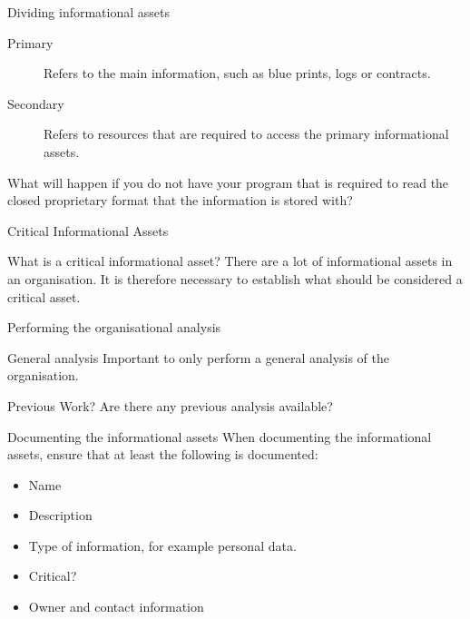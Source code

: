 \documentclass{beamer}
\begin{document}
\begin{frame}{Dividing informational assets}{\insertsubsubsectionhead}
  \begin{description}
    \item[Primary] Refers to the main information, such as blue prints, logs or
      contracts.
    \item[Secondary] Refers to resources that are required to access the primary
      informational assets.
  \end{description}
  What will happen if you do not have your program that is required to read the
  closed proprietary format that the information is stored with?
\end{frame}
\begin{frame}{Critical Informational Assets}
  \centering
  \begin{block}{What is a critical informational asset?}
    There are a lot of informational assets in an organisation. It is therefore
    necessary to establish what should be considered a critical asset.
  \end{block}
\end{frame}

\begin{frame}{Performing the organisational analysis}{\insertsubsubsectionhead}
  \begin{block}{General analysis}
    Important to only perform a general analysis of the organisation.
  \end{block}
  \begin{block}{Previous Work?}
    Are there any previous analysis available?
  \end{block}
\end{frame}

\begin{frame}{Documenting the informational assets}
  When documenting the informational assets, ensure that at least the following
  is documented:
  \begin{itemize}
    \item Name
    \item Description
    \item Type of information, for example personal data.
    \item Critical?
    \item Owner and contact information
  \end{itemize}
\end{frame}
\end{document}
